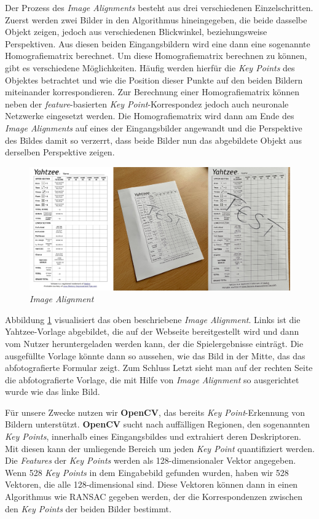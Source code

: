 Der Prozess des \textit{Image Alignments} besteht aus drei verschiedenen Einzelschritten.
Zuerst werden zwei Bilder in den Algorithmus hineingegeben, die beide dasselbe Objekt zeigen, jedoch aus verschiedenen Blickwinkel, beziehungsweise Perspektiven. 
Aus diesen beiden Eingangsbildern wird eine dann eine sogenannte Homografiematrix berechnet. Um diese Homografiematrix berechnen zu können, gibt es verschiedene
Möglichkeiten. Häufig werden hierfür die \textit{Key Points} des Objektes betrachtet und wie die Position dieser Punkte auf den beiden Bildern miteinander korrespondieren. 
Zur Berechnung einer Homografiematrix können neben der \textit{feature}-basierten \textit{Key Point}-Korrespondez jedoch auch neuronale Netzwerke eingesetzt werden. 
Die Homografiematrix wird dann am Ende des \textit{Image Alignments} auf eines der Eingangsbilder angewandt und die Perspektive des Bildes damit so verzerrt, 
dass beide Bilder nun das abgebildete Objekt aus derselben Perspektive zeigen.\cite{rosebrock}

\begin{figure}[H]
	\centering
	\includegraphics[width=\imgMed]{images/practice/image_alignment.jpg}
	\caption{\textit{Image Alignment}} 
	\label{fig:image_alignment}
\end{figure}

Abbildung \ref{fig:image_alignment} visualisiert das oben beschriebene \textit{Image Alignment}. Links ist die Yahtzee-Vorlage abgebildet, die auf der Webseite 
bereitgestellt wird und dann vom Nutzer heruntergeladen werden kann, der die Spielergebnisse einträgt. Die ausgefüllte Vorlage könnte dann so aussehen, wie das 
Bild in der Mitte, das das abfotografierte Formular zeigt. Zum Schluss Letzt sieht man auf der rechten Seite die abfotografierte Vorlage, die mit Hilfe von 
\textit{Image Alignment} so ausgerichtet wurde wie das linke Bild.

Für unsere Zwecke nutzen wir \textbf{OpenCV}, das bereits \textit{Key Point}-Erkennung von Bildern unterstützt. \textbf{OpenCV} sucht nach auffälligen Regionen,
den sogenannten \textit{Key Points}, innerhalb eines Eingangsbildes und extrahiert deren Deskriptoren. Mit diesen kann der umliegende Bereich um jeden 
\textit{Key Point} quantifiziert werden. Die \textit{Features} der \textit{Key Points} werden als 128-dimensionaler Vektor angegeben. Wenn 528 \textit{Key Points}
in dem Eingabebild gefunden wurden, haben wir 528 Vektoren, die alle 128-dimensional sind. Diese Vektoren können dann in einen Algorithmus wie RANSAC gegeben
werden, der die Korrespondenzen zwischen den \textit{Key Points} der beiden Bilder bestimmt.

